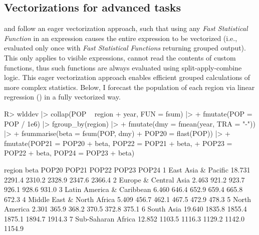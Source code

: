 \documentclass[article]{jss} %
\newcommand{\fct}[1]{\code{#1()}}
\begin{document}
\subsection{Vectorizations for advanced tasks} \label{ssec:vfat}
%
\fct{fsummarise} and \fct{fmutate} follow an eager vectorization approach, such that using any \emph{Fast Statistical Function} in an expression causes the entire expression to be vectorized (i.e., evaluated only once with \emph{Fast Statistical Functions} returning grouped output). This only applies to visible expressions,  cannot read the contents of custom functions, thus such functions are always evaluated using split-apply-combine logic. This eager vectorization approach enables efficient grouped calculations of more complex statistics. Below, I forecast the population of each region via linear regression () in a fully vectorized way.
%
\begin{Schunk}
\begin{Sinput}
R> wlddev |> collap(POP ~ region + year, FUN = fsum) |>
+    fmutate(POP = POP / 1e6) |> fgroup_by(region) |>
+    fmutate(dmy = fmean(year, TRA = "-")) |>
+    fsummarise(beta = fsum(POP, dmy) %/=% fsum(dmy, dmy),
+               POP20 = flast(POP)) |>
+    fmutate(POP21 = POP20 + beta, POP22 = POP21 + beta,
+            POP23 = POP22 + beta, POP24 = POP23 + beta)
\end{Sinput}
\begin{Soutput}
                      region   beta  POP20  POP21  POP22  POP23  POP24
1        East Asia & Pacific 18.731 2291.4 2310.2 2328.9 2347.6 2366.4
2      Europe & Central Asia  2.463  921.2  923.7  926.1  928.6  931.0
3  Latin America & Caribbean  6.460  646.4  652.9  659.4  665.8  672.3
4 Middle East & North Africa  5.409  456.7  462.1  467.5  472.9  478.3
5              North America  2.301  365.9  368.2  370.5  372.8  375.1
6                 South Asia 19.640 1835.8 1855.4 1875.1 1894.7 1914.3
7         Sub-Saharan Africa 12.852 1103.5 1116.3 1129.2 1142.0 1154.9
\end{Soutput}
\end{Schunk}
%
\end{document}
